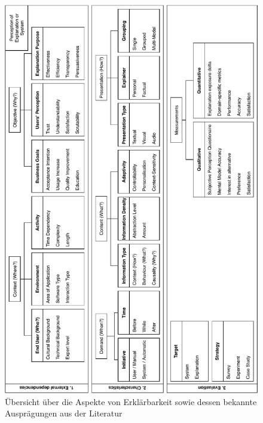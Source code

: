 \begin{figure}[htb!]
    \begin{center}
        \includegraphics[width=\linewidth]{contents/05_model_description/res/model_overview_complete.pdf}
    \end{center}
    \caption{Übersicht über die Aspekte von Erklärbarkeit sowie dessen bekannte Ausprägungen aus der Literatur}
    \label{fig:model_overview_complete}
\end{figure}



